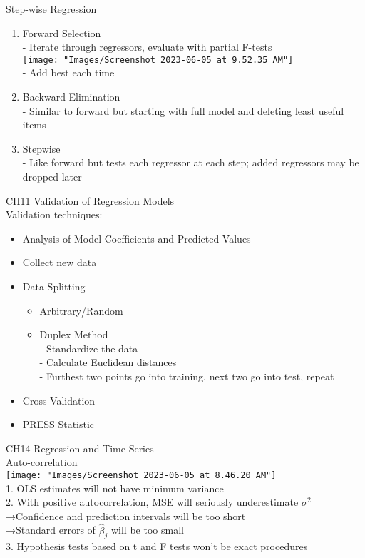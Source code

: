 \documentclass[17pt]{extarticle}%
\begin{document}
Step-wise Regression
\begin{enumerate}
\item Forward Selection \\
- Iterate through regressors, evaluate with partial F-tests \\
\texttt{[image: "Images/Screenshot 2023-06-05 at 9.52.35 AM"]} \\
- Add best each time
\item Backward Elimination \\
- Similar to forward but starting with full model and deleting least useful items
\item Stepwise \\
- Like forward but tests each regressor at each step; added regressors may be dropped later
\end{enumerate}



\clearpage
{\Large CH11 Validation of Regression Models} \\
%
Validation techniques:
\begin{itemize}
\item Analysis of Model Coefficients and Predicted Values
\item Collect new data
\item Data Splitting
\begin{itemize}
	\item Arbitrary/Random
	\item Duplex Method \\
	- Standardize the data \\
	- Calculate Euclidean distances \\
	- Furthest two points go into training, next two go into test, repeat
\end{itemize}
\item Cross Validation
\item PRESS Statistic
\end{itemize}

%

	
\clearpage
{\Large CH14 Regression and Time Series} \\
%
Auto-correlation \\
\texttt{[image: "Images/Screenshot 2023-06-05 at 8.46.20 AM"]} \\
1. OLS estimates will not have minimum variance \\
2. With positive autocorrelation, MSE will seriously underestimate $\sigma^2$ \\
→Confidence and prediction intervals will be too short \\
→Standard errors of $\hat\beta_j$ will be too small \\
3. Hypothesis tests based on t and F tests won’t be exact procedures \\
\end{document}
